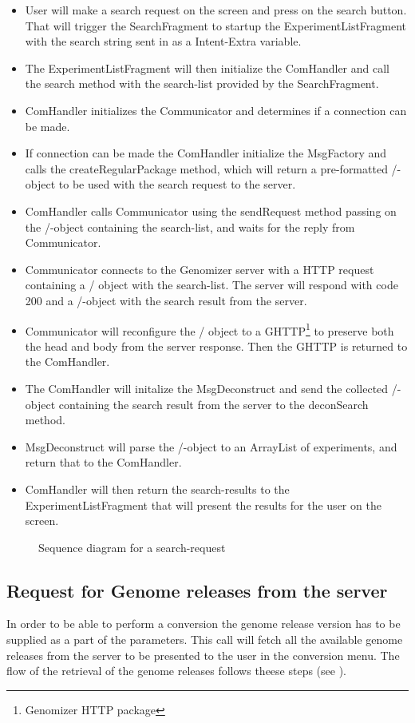	\begin{itemize}
		\item
			User will make a search request on the screen and press on the search button. That will trigger the SearchFragment to startup the ExperimentListFragment with the search string sent in as a Intent-Extra variable.
		\item
			The ExperimentListFragment will then initialize the ComHandler and call the search method with the search-list provided by the SearchFragment.
		\item
			ComHandler initializes the Communicator and determines if a connection can be made.
		\item
			If connection can be made the ComHandler initialize the MsgFactory and calls the createRegularPackage method, which will return a pre-formatted \json/-object to be used with the search request to the server.
		\item
			ComHandler calls Communicator using the sendRequest method passing on the \json/-object containing the search-list, and waits for the reply from Communicator.
		\item
			Communicator connects to the Genomizer server with a HTTP request containing a \json/ object with the search-list. The server will respond with code 200 and a \json/-object with the search result from the server.
		\item
			Communicator will reconfigure the \json/ object to a GHTTP\footnote{Genomizer HTTP package} to preserve both the head and body from the server response. Then the GHTTP is returned to the ComHandler.
		\item
			The ComHandler will initalize the MsgDeconstruct and send the collected \json/-object containing the search result from the server to the deconSearch method.
		\item
			MsgDeconstruct will parse the \json/-object to an ArrayList of experiments, and return that to the ComHandler.
		\item
			ComHandler will then return the search-results to the ExperimentListFragment that will present the results for the user on the screen.
	\end{itemize} 

	\begin{figure}
		\caption{Sequence diagram for a search-request}
		\label{fig:and_searchseq}
	\end{figure}
    \FloatBarrier
\subsection{Request for Genome releases from the server}
	In order to be able to perform a conversion the genome release version has to be supplied as a part of the parameters. This call will fetch all the available genome releases from the server to be presented to the user in the conversion menu. The flow of the retrieval of the genome releases follows theese steps (see ).
    
